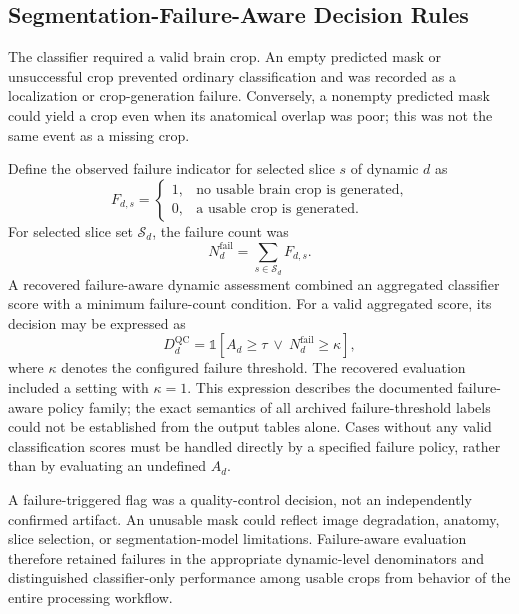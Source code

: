 \subsection{Segmentation-Failure-Aware Decision Rules}
\label{subsec:2d_failure_aware_rules}

The classifier required a valid brain crop. An empty predicted mask or unsuccessful crop prevented ordinary classification and was recorded as a localization or crop-generation failure. Conversely, a nonempty predicted mask could yield a crop even when its anatomical overlap was poor; this was not the same event as a missing crop.

Define the observed failure indicator for selected slice $s$ of dynamic $d$ as
\begin{equation}
F_{d,s}=
\begin{cases}
1,&\text{no usable brain crop is generated},\\
0,&\text{a usable crop is generated}.
\end{cases}
\end{equation}
For selected slice set $\mathcal{S}_d$, the failure count was
\begin{equation}
N_d^{\mathrm{fail}}=\sum_{s\in\mathcal{S}_d}F_{d,s}.
\end{equation}
A recovered failure-aware dynamic assessment combined an aggregated classifier score with a minimum failure-count condition. For a valid aggregated score, its decision may be expressed as
\begin{equation}
D_d^{\mathrm{QC}}=
\mathbb{1}\!\left[A_d\geq\tau\ \lor\ N_d^{\mathrm{fail}}\geq\kappa\right],
\end{equation}
where $\kappa$ denotes the configured failure threshold. The recovered evaluation included a setting with $\kappa=1$. This expression describes the documented failure-aware policy family; the exact semantics of all archived failure-threshold labels could not be established from the output tables alone. Cases without any valid classification scores must be handled directly by a specified failure policy, rather than by evaluating an undefined $A_d$.

A failure-triggered flag was a quality-control decision, not an independently confirmed artifact. An unusable mask could reflect image degradation, anatomy, slice selection, or segmentation-model limitations. Failure-aware evaluation therefore retained failures in the appropriate dynamic-level denominators and distinguished classifier-only performance among usable crops from behavior of the entire processing workflow.

